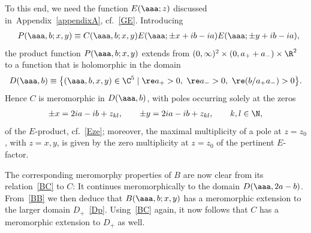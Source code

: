 To this end, we need the function $E(\aaa;z)$ discussed in~Appendix~\ref{appendixA}, cf.~\eqref{GE}. Introducing
\begin{gather}\label{P}
P(\aaa,b;x,y)\equiv C(\aaa,b;x,y)E(\aaa;\pm x+ib-ia)E(\aaa;\pm y+ib-ia),\!\!\!\!
\end{gather}
the product function $P(\aaa,b;x,y)$ extends from $(0,\infty)^2\times (0,a_{+}+a_-)\times \R^2$ to a function that is holomorphic in the domain
\begin{gather}
D(\aaa,b)\equiv \big\{ (\aaa,b,x,y)\in \C^5 \mid \re a_+>0,\ \re a_->0, \ \re (b/a_+a_-)>0\big\}.
\end{gather}
 Hence $C$ is meromorphic in $D(\aaa,b)$, with poles occurring solely at the zeros
\begin{gather}
\pm x=2ia-ib+z_{kl},\qquad \pm y=2ia-ib+z_{kl},\qquad k,l\in\N,
\end{gather}
of the $E$-product, cf.~\eqref{Eze}; moreover, the maximal multiplicity of a pole at $z=z_0$, with $z=x,y$, is given by the zero multiplicity at $z=z_0$ of the pertinent $E$-factor.

The corresponding meromorphy properties of $B$ are now clear from its relation~\eqref{BC} to $C$: It continues meromorphically to the domain $D(\aaa,2a-b)$. From~\eqref{BB} we then deduce that $B(\aaa,b;x,y)$ has a meromorphic extension to the larger domain $D_+$~\eqref{Dp}.
Using~\eqref{BC} again, it now follows that $C$ has a meromorphic extension to $D_+$ as well.

